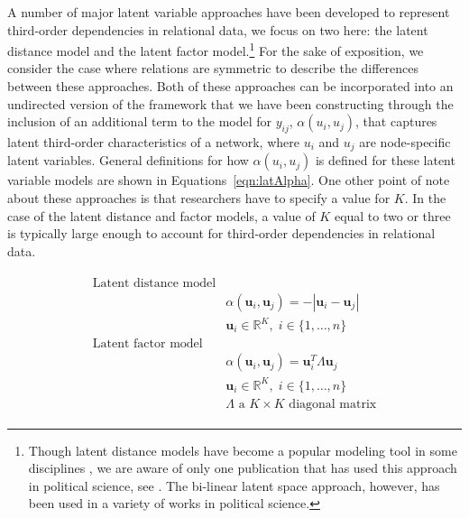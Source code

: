 \documentclass[12pt,pdflatex]{elsarticle}
\begin{document}
A number of major latent variable approaches have been developed to represent third-order dependencies in relational data, we focus on two here: the latent distance model and the latent factor model.\footnote{Though latent distance models have become a popular modeling tool in some disciplines \citep{salter:etal:2012}, we are aware of only one publication that has used this approach in political science, see \citet{kirkland:2012}. The bi-linear latent space approach, however, has been used in a variety of works in political science.} For the sake of exposition, we consider the case where relations are symmetric to describe the differences between these approaches. Both of these approaches can be incorporated into an undirected version of the framework that we have been constructing through the inclusion of an additional term to the model for $y_{ij}$, $\alpha(u_{i}, u_{j})$, that captures latent third-order characteristics of a network, where $u_{i}$ and $u_{j}$ are node-specific latent variables. General definitions for how $\alpha(u_{i}, u_{j})$ is defined for these latent variable models are shown in Equations~\ref{eqn:latAlpha}. One other point of note about these approaches is that researchers have to specify a value for $K$. In the case of the latent distance and factor models, a value of $K$ equal to two or three is typically large enough to account for third-order dependencies in relational data. 

\begin{align}
\begin{aligned}
\text{Latent distance model} \\
	&\alpha(\textbf{u}_{i}, \textbf{u}_{j}) = -|\textbf{u}_{i} - \textbf{u}_{j}| \\
	&\textbf{u}_{i} \in \mathbb{R}^{K}, \; i \in \{1, \ldots, n \} \\
\text{Latent factor model} \\
	&\alpha(\textbf{u}_{i}, \textbf{u}_{j}) = \textbf{u}_{i}^{T} \Lambda \textbf{u}_{j} \\
	&\textbf{u}_{i} \in \mathbb{R}^{K}, \; i \in \{1, \ldots, n \} \\
	&\Lambda \text{ a } K \times K \text{ diagonal matrix}
\label{eqn:latAlpha}
\end{aligned}
\end{align}
\end{document}
